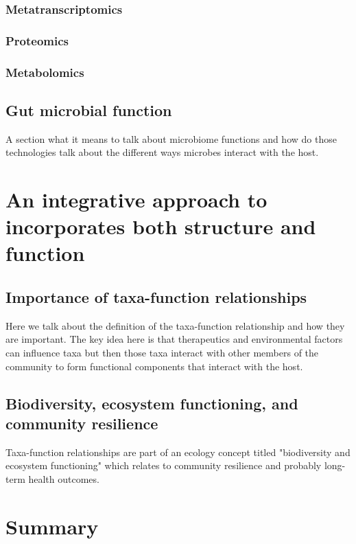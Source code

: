 \subsubsection{Metatranscriptomics}
\subsubsection{Proteomics}
\subsubsection{Metabolomics}

\subsection{Gut microbial function}
A section what it means to talk about microbiome functions and how do those technologies talk about the different ways microbes interact with the host. 


\section{An integrative approach to incorporates both structure and function}

\subsection{Importance of taxa-function relationships}
Here we talk about the definition of the taxa-function relationship and how they are important. The key idea here is that therapeutics and environmental factors can influence taxa but then those taxa interact with other members of the community to form functional components that interact with the host. 


\subsection{Biodiversity, ecosystem functioning, and community resilience}
Taxa-function relationships are part of an ecology concept titled "biodiversity and ecosystem functioning" which relates to community resilience and probably long-term health outcomes. 


\section{Summary}
